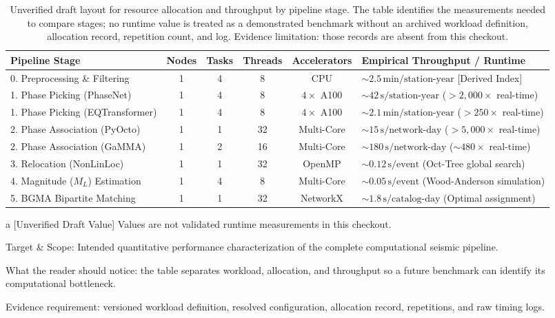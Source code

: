 \begin{table}[htbp]
  \centering
  \small
  \caption{Unverified draft layout for resource allocation and throughput by pipeline stage. The table identifies the measurements needed to compare stages; no runtime value is treated as a demonstrated benchmark without an archived workload definition, allocation record, repetition count, and log. Evidence limitation: those records are absent from this checkout.}
  \label{tab:stage_benchmarks}
  \begin{threeparttable}
    \begin{tabularx}{\linewidth}{l c c c c X}
      \toprule
      \textbf{Pipeline Stage} & \textbf{Nodes} & \textbf{Tasks} & \textbf{Threads} & \textbf{Accelerators} & \textbf{Empirical Throughput / Runtime\tnote{a}} \\
      \midrule
      0. Preprocessing \& Filtering & 1 & 4 & 8 & CPU & $\sim 2.5\,\mathrm{min} / \text{station-year}$ [Derived Index] \\
      1. Phase Picking (PhaseNet) & 1 & 4 & 8 & $4\times$ A100 & $\sim 42\,\mathrm{s} / \text{station-year}$ ($> 2{,}000\times$ real-time) \\
      1. Phase Picking (EQTransformer) & 1 & 4 & 8 & $4\times$ A100 & $\sim 2.1\,\mathrm{min} / \text{station-year}$ ($> 250\times$ real-time) \\
      2. Phase Association (PyOcto) & 1 & 1 & 32 & Multi-Core & $\sim 15\,\mathrm{s} / \text{network-day}$ ($> 5{,}000\times$ real-time) \\
      2. Phase Association (GaMMA) & 1 & 2 & 16 & Multi-Core & $\sim 180\,\mathrm{s} / \text{network-day}$ ($\sim 480\times$ real-time) \\
      3. Relocation (NonLinLoc) & 1 & 1 & 32 & OpenMP & $\sim 0.12\,\mathrm{s} / \text{event}$ (Oct-Tree global search) \\
      4. Magnitude ($M_L$) Estimation & 1 & 4 & 8 & Multi-Core & $\sim 0.05\,\mathrm{s} / \text{event}$ (Wood-Anderson simulation) \\
      5. BGMA Bipartite Matching & 1 & 1 & 32 & NetworkX & $\sim 1.8\,\mathrm{s} / \text{catalog-day}$ (Optimal assignment) \\
      \bottomrule
    \end{tabularx}
    \begin{tablenotes}[flushleft]
      \footnotesize
      \item[a] [Unverified Draft Value] Values are not validated runtime measurements in this checkout.
      \item Target \& Scope: Intended quantitative performance characterization of the complete computational seismic pipeline.
      \item What the reader should notice: the table separates workload, allocation, and throughput so a future benchmark can identify its computational bottleneck.
      \item Evidence requirement: versioned workload definition, resolved configuration, allocation record, repetitions, and raw timing logs.
    \end{tablenotes}
  \end{threeparttable}
\end{table}

